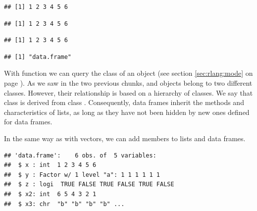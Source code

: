 \documentclass[krantz2]{krantz}\usepackage{knitr}
\begin{document}
\begin{knitrout}\footnotesize
{}\color{fgcolor}\begin{kframe}
\begin{alltt}
\hlopt{$}
\end{alltt}
\begin{verbatim}
## [1] 1 2 3 4 5 6
\end{verbatim}
\begin{alltt}
\hlstd{a.df[[}\hlstd{]]}
\end{alltt}
\begin{verbatim}
## [1] 1 2 3 4 5 6
\end{verbatim}
\begin{alltt}
\hlstd{a.df[[}\hlstd{]]}
\end{alltt}
\begin{verbatim}
## [1] 1 2 3 4 5 6
\end{verbatim}
\begin{alltt}
\end{alltt}
\begin{verbatim}
## [1] "data.frame"
\end{verbatim}
\end{kframe}
\end{knitrout}

With function  we can query the class of an \Rlang object (see section \ref{sec:rlang:mode} on page \pageref{sec:rlang:mode}). As we saw in the two previous chunks,  and  objects belong to two different classes. However, their relationship is based on a hierarchy of classes. We say that class  is derived from class . Consequently, data frames inherit the methods and characteristics of lists, as long as they have not been hidden by new ones defined for data frames.

In the same way as with vectors, we can add members to lists and data frames.

\begin{knitrout}\footnotesize
{}\color{fgcolor}\begin{kframe}
\begin{alltt}
\hlopt{$} \hlkwb{<-} \hlopt{:}
\hlopt{$} \hlkwb{<-} 
\end{alltt}
\begin{verbatim}
## 'data.frame':	6 obs. of  5 variables:
##  $ x : int  1 2 3 4 5 6
##  $ y : Factor w/ 1 level "a": 1 1 1 1 1 1
##  $ z : logi  TRUE FALSE TRUE FALSE TRUE FALSE
##  $ x2: int  6 5 4 3 2 1
##  $ x3: chr  "b" "b" "b" "b" ...
\end{verbatim}
\end{kframe}
\end{knitrout}
\end{document}
